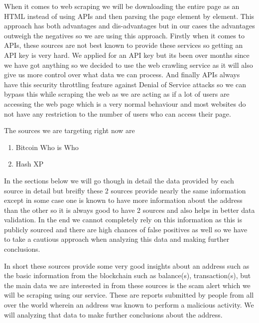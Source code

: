 \documentclass{article}
\begin{document}
        When it comes to web scraping we will be downloading the entire page as an HTML instead of using APIs and then parsing the page element by element. This approach has both advantages and dis-advantages but in our cases the advantages outweigh the negatives so we are using this approach. Firstly when it comes to APIs, these sources are not best known to provide these services so getting an API key is very hard. We applied for an API key but its been over months since we have got anything so we decided to use the web crawling service as it will also give us more control over what data we can process. And finally APIs always have this security throttling feature against Denial of Service attacks so we can bypass this while scraping the web as we are acting as if a lot of users are accessing the web page which is a very normal behaviour and most websites do not have any restriction to the number of users who can access their page.
        
        The sources we are targeting right now are 
        \begin{enumerate}
            \item Bitcoin Who is Who \cite{bitcoinwhoswho}
            \item Hash XP \cite{hashxp.org}
        \end{enumerate}
        In the sections below we will go though in detail the data provided by each source in detail but breifly these 2 sources provide nearly the same information except in some case one is known to have more information about the address than the other so it is always good to have 2 sources and also helps in better data validation. In the end we cannot completely rely on this information as this is publicly sourced and there are high chances of false positives as well so we have to take a cautious approach when analyzing this data and making further conclusions. 
        
        In short these sources provide some very good insights about an address such as the basic information from the blockchain such as balance(s), transaction(s), but the main data we are interested in from these sources is the scam alert which we will be scraping using our service. These are reports submitted by people from all over the world wherein an address was known to perform a malicious activity. We will analyzing that data to make further conclusions about the address.
        
\end{document}
